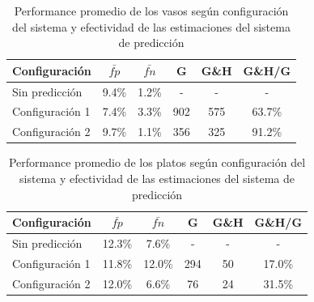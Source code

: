 \begin{table}[h]
  \begin{tabular}{|l | c | c | c | c | c|}
	\hline
	\textbf{Configuración} & \textbf{$\bar{fp}$} &  \textbf{$\bar{fn}$}& \textbf{G} &  \textbf{G\&H} &  \textbf{G\&H/G} \\
	\hline
	\hline
	Sin predicción  & 9.4\% & 1.2\% & - & - & -\\
	\hline
	Configuración 1 & 7.4\% &	3.3\% & 902 & 575 & 63.7\% \\
	\hline
	Configuración 2 & 9.7\% &	1.1\% & 356 & 325 & 91.2\%\\
	\hline
	\end{tabular}
	\caption{\label{tab:evo_vasos} Performance promedio de los vasos según configuración del 
	sistema y efectividad de las estimaciones del sistema de predicción}
\end{table}



\begin{table}[h]
  \begin{tabular}{|l | c | c | c | c | c|}
	\hline
	\textbf{Configuración} & \textbf{$\bar{fp}$} &  \textbf{$\bar{fn}$}& \textbf{G} &  \textbf{G\&H} &  \textbf{G\&H/G} \\
	\hline
	\hline
	Sin predicción &  12.3\% & 7.6\% & - & - & -\\
	\hline
	Configuración 1 & 11.8\% & 12.0\% & 294 & 50 & 17.0\%\\
	\hline
	Configuración 2 & 12.0\% & 6.6\% & 76 & 24 & 31.5\% \\
	\hline
	\end{tabular}
	\caption{\label{tab:evo_platos} Performance promedio de los platos según configuración del 
	sistema y efectividad de las estimaciones del sistema de predicción}
\end{table}



